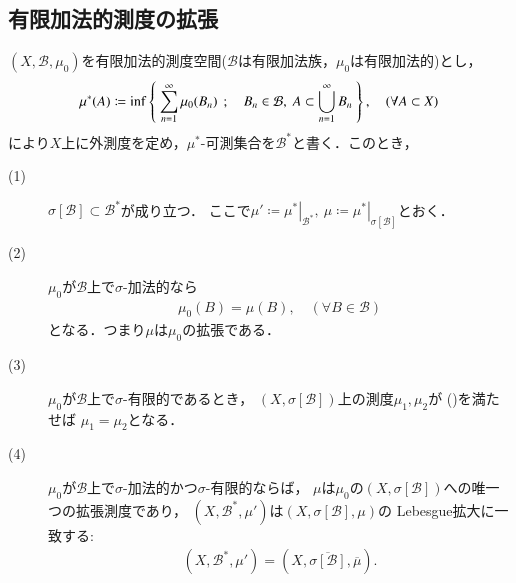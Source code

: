 	\subsection{有限加法的測度の拡張}
		\begin{screen}
			\begin{thm}
				$(X,\mathcal{B},\mu_0)$を有限加法的測度空間($\mathcal{B}$は有限加法族，$\mu_0$は有限加法的)とし，
				\begin{align}
					\mu^*(A) \coloneqq \operatorname*{inf}_{} \left\{\ \sum_{n=1}^\infty \mu_0(B_n)\ \, ; \quad B_n \in \mathcal{B},\ A \subset \bigcup_{n=1}^\infty B_n\ \right\},
					\quad (\forall A \subset X)
				\end{align}
				により$X$上に外測度を定め，$\mu^*$-可測集合を$\mathcal{B}^*$と書く．このとき，
				\begin{description}
					\item[(1)] $\sigma[\mathcal{B}] \subset \mathcal{B}^*$が成り立つ．
						ここで$\mu' \coloneqq\left.\mu^*\right|_{\mathcal{B}^*},
						\ \mu \coloneqq \left.\mu^*\right|_{\sigma[\mathcal{B}]}$とおく．
					\item[(2)] $\mu_0$が$\mathcal{B}$上で$\sigma$-加法的なら
						\begin{align}
							\mu_0(B) = \mu(B),\quad (\forall B \in \mathcal{B})
							\label{eq:appendix_finite_additive_measure_expansion_1}
						\end{align}
						となる．つまり$\mu$は$\mu_0$の拡張である．
						
					\item[(3)] $\mu_0$が$\mathcal{B}$上で$\sigma$-有限的であるとき，
						$\left( X,\sigma[\mathcal{B}] \right)$上の測度$\mu_1,\mu_2$が
						()を満たせば
						$\mu_1 = \mu_2$となる．
					
					\item[(4)] $\mu_0$が$\mathcal{B}$上で$\sigma$-加法的かつ$\sigma$-有限的ならば，
						$\mu$は$\mu_0$の$\left( X,\sigma[\mathcal{B}] \right)$への唯一つの拡張測度であり，
						$\left( X,\mathcal{B}^*,\mu' \right)$は$(X,\sigma[\mathcal{B}],\mu)$の
						Lebesgue拡大に一致する:
						\begin{align}
							\left( X,\mathcal{B}^*,\mu' \right) 
							= \left( X,\overline{\sigma[\mathcal{B}]},\overline{\mu} \right).
							\label{eq:appendix_finite_additive_measure_expansion_5}
						\end{align}
				\end{description}
			\end{thm}
		\end{screen}
		
